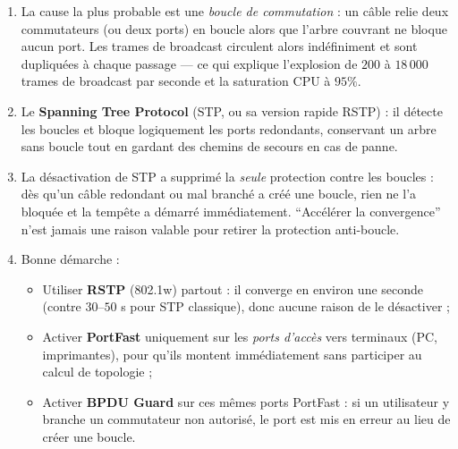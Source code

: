 \documentclass[11pt]{article}
\begin{document}
\begin{corrige}
\begin{enumerate}
\item La cause la plus probable est une \emph{boucle de commutation} : un câble relie deux commutateurs (ou deux ports) en boucle alors que l'arbre couvrant ne bloque aucun port. Les trames de broadcast circulent alors indéfiniment et sont dupliquées à chaque passage --- ce qui explique l'explosion de $200$ à $18\,000$ trames de broadcast par seconde et la saturation CPU à $95\%$.
\item Le \textbf{Spanning Tree Protocol} (STP, ou sa version rapide RSTP) : il détecte les boucles et bloque logiquement les ports redondants, conservant un arbre sans boucle tout en gardant des chemins de secours en cas de panne.
\item La désactivation de STP a supprimé la \emph{seule} protection contre les boucles : dès qu'un câble redondant ou mal branché a créé une boucle, rien ne l'a bloquée et la tempête a démarré immédiatement. ``Accélérer la convergence'' n'est jamais une raison valable pour retirer la protection anti-boucle.
\item Bonne démarche :
\begin{itemize}
\item Utiliser \textbf{RSTP} (802.1w) partout : il converge en environ une seconde (contre $30$--$50$ s pour STP classique), donc aucune raison de le désactiver ;
\item Activer \textbf{PortFast} uniquement sur les \emph{ports d'accès} vers terminaux (PC, imprimantes), pour qu'ils montent immédiatement sans participer au calcul de topologie ;
\item Activer \textbf{BPDU Guard} sur ces mêmes ports PortFast : si un utilisateur y branche un commutateur non autorisé, le port est mis en erreur au lieu de créer une boucle.
\end{itemize}
\end{enumerate}
\end{corrige}
\end{document}
